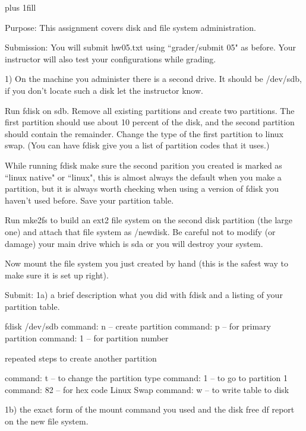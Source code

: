 
\rightskip=0pt plus 1fill

\parindent 0pt

Purpose: This assignment covers disk and file system administration.

Submission: You will submit hw05.txt using ``\tilde grader/submit 05" as before.
Your instructor will also test your configurations while grading.

1) On the machine you administer there is a second drive.
It should be {\ltt{}/dev/sdb}, if you don't locate such a disk
let the instructor know.

Run {\ltt{}fdisk} on {\ltt{}sdb}.
Remove all existing partitions and create two partitions.
The first partition should use about 10 percent of the
disk, and the second partition should contain the remainder.
Change the type of the first partition to linux swap.
(You can have {\ltt{}fdisk} give you a list of partition codes that it uses.)

While running {\ltt{}fdisk} make sure the second parition
you created is marked as ``linux native" or ``linux", this is almost 
always the default when you make a partition, but it is always worth checking
when using a version of {\ltt{}fdisk} you haven't used before.
Save your partition table.

Run {\ltt{}mke2fs} to build 
an ext2 file system on the second disk partition (the large
one) and attach that file system as {\ltt{}/newdisk}.
Be careful not to modify (or damage) your main drive
which is {\ltt{}sda} or you will destroy your system.

Now mount the file system you just created by hand
(this is the safest way to make sure it is set up right).

Submit: 
1a) a brief description what you did with {\ltt{}fdisk} and
a listing of your partition table.

fdisk /dev/sdb
command: n -- create partition
command: p -- for primary partition
command: 1 -- for partition number

repeated steps to create another partition

command: t -- to change the partition type
command: 1 -- to go to partition 1
command: 82 -- for hex code Linux Swap
command: w -- to write table to disk


1b) the exact form of the {\ltt{}mount} command you used and
the disk free {\ltt{}df} report on the new file system.

